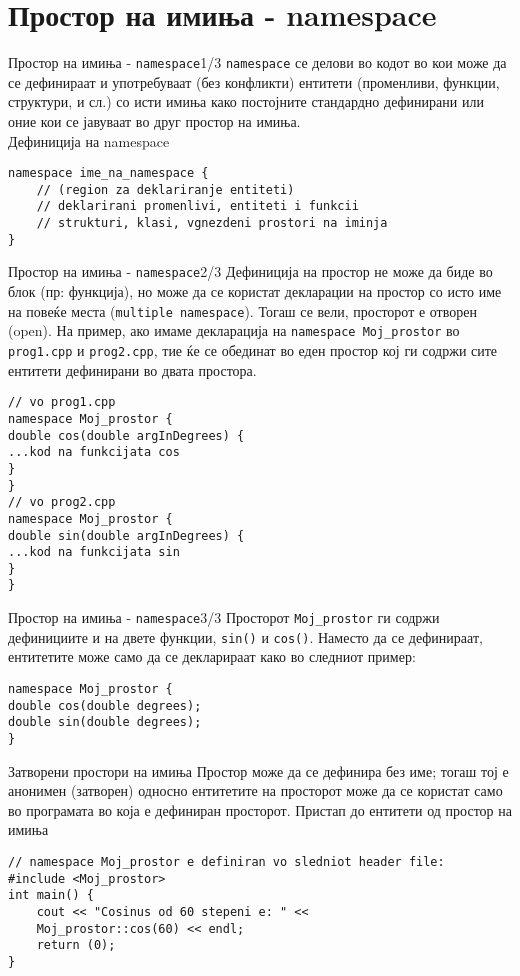\section{Простор на имиња - namespace}
\begin{frame}[fragile]{Простор на имиња - \texttt{namespace}}{1/3}
\texttt{namespace} се делови во кодот во кои може да се дефинираат и употребуваат (без
конфликти) ентитети (променливи, функции, структури, и сл.) со исти имиња како
постојните стандардно дефинирани или оние кои се јавуваат во друг простор на
имиња.\\
Дефиниција на namespace
\begin{lstlisting}
namespace ime_na_namespace {
    // (region za deklariranje entiteti)
    // deklarirani promenlivi, entiteti i funkcii
    // strukturi, klasi, vgnezdeni prostori na iminja
}
\end{lstlisting}
\end{frame}

\begin{frame}[fragile]{Простор на имиња - \texttt{namespace}}{2/3}
Дефиниција на простор не може да биде во блок (пр: функција), но може да се
користат декларации на простор со исто име на повеќе места (\texttt{multiple namespace}).
Тогаш се вели, просторот е отворен (open).
На пример, ако имаме декларација на \texttt{namespace Moj\_prostor} во
\texttt{prog1.cpp} и \texttt{prog2.cpp}, тие ќе се обединат во еден простор кој
ги содржи сите ентитети дефинирани во двата простора.
\begin{lstlisting}
// vo prog1.cpp
namespace Moj_prostor {
double cos(double argInDegrees) {
...kod na funkcijata cos
}
}
// vo prog2.cpp
namespace Moj_prostor {
double sin(double argInDegrees) {
...kod na funkcijata sin
}
}
\end{lstlisting}
\end{frame}

\begin{frame}[fragile]{Простор на имиња - \texttt{namespace}}{3/3}
Просторот \texttt{Moj\_prostor} ги содржи дефинициите и на двете функции,
\texttt{sin()} и \texttt{cos()}. Наместо да се дефинираат, ентитетите може само да се декларираат како во
следниот пример:
\begin{lstlisting}
namespace Moj_prostor {
double cos(double degrees);
double sin(double degrees);
}
\end{lstlisting}
\end{frame}


\begin{frame}[fragile]{Затворени простори на имиња}
Простор може да се дефинира без име; тогаш тој е анонимен (затворен) односно
ентитетите на просторот може да се користат само во програмата во која е
дефиниран просторот.
Пристап до ентитети од простор на имиња
\begin{lstlisting}
// namespace Moj_prostor e definiran vo sledniot header file:
#include <Moj_prostor>
int main() {
    cout << "Cosinus od 60 stepeni e: " <<
    Moj_prostor::cos(60) << endl;
    return (0);
}
\end{lstlisting}
\end{frame}

